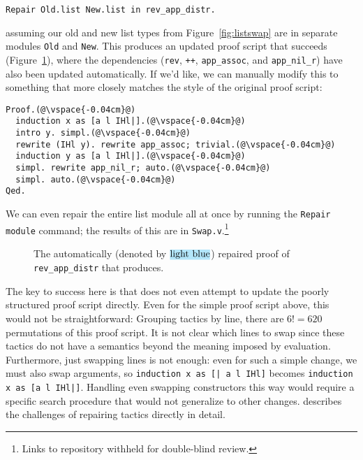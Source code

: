 \begin{lstlisting}
Repair Old.list New.list in rev_app_distr.
\end{lstlisting}
assuming our old and new list types from Figure~\ref{fig:listswap} are in separate modules \lstinline{Old} and \lstinline{New}.
This produces an updated proof script that succeeds (Figure~\ref{fig:auto}),
where the dependencies (\lstinline{rev}, \lstinline{++}, \lstinline{app_assoc}, and \lstinline{app_nil_r}) have
also been updated automatically.
If we'd like, we can manually modify this to something that more closely matches the style of the original proof script:

\begin{lstlisting}
Proof.(@\vspace{-0.04cm}@)
  induction x as [a l IHl|].(@\vspace{-0.04cm}@)
  intro y. simpl.(@\vspace{-0.04cm}@)
  rewrite (IHl y). rewrite app_assoc; trivial.(@\vspace{-0.04cm}@)
  induction y as [a l IHl|].(@\vspace{-0.04cm}@)
  simpl. rewrite app_nil_r; auto.(@\vspace{-0.04cm}@)
  simpl. auto.(@\vspace{-0.04cm}@)
Qed.
\end{lstlisting}
We can even repair the entire list module all at once by running the \lstinline{Repair module}
command; the results of this are in \lstinline{Swap.v}.\footnote{Links to repository withheld for double-blind review.} %

\begin{figure}
\codeauto{}
\vspace{-0.2cm}
\caption{The automatically (denoted by $\codeauto{light blue}$) repaired proof of \lstinline{rev_app_distr} that \toolname produces.}
\label{fig:auto}
\end{figure} %

The key to success here is that \toolname does not even attempt to update the poorly structured proof script directly.
Even for the simple proof script above, this would not be straightforward: Grouping tactics by line, there are $6! = 620$
permutations of this proof script.
It is not clear which lines to swap since these tactics do not have a semantics beyond the meaning imposed by evaluation.
Furthermore, just swapping lines is not enough: even for such a simple change, we must also swap
arguments, so \lstinline{induction x as [| a l IHl]} becomes \lstinline{induction x as [a l IHl|]}.
Handling even swapping constructors this way would require a specific search procedure that would not generalize to other changes.
\citet{robert2018} describes the challenges of repairing tactics directly in detail.

